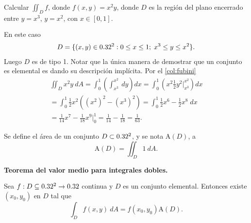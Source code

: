 \begin{example}
    Calcular $\iint_D f$, donde $f(x,y)=x^2y$, donde $D$ es la regi\'on del plano encerrado entre $y=x^3$, $y=x^2$, con $x\in[0,1]$. 

    \begin{center}
    \end{center}

    En este caso 
    \[
        D=\{(x,y)\in0.32^2:0\leq x\leq1;\;x^3\leq y\leq x^2\}.  
    \]
    Luego $D$ es de tipo 1. Notar que la \'unica manera de demostrar que un conjunto es elemental es dando su descripci\'on impl\'icita. Por el \autoref{col:fubini}
    \begin{gather*}
        \iint_D x^2y\:dA=\int_0^1\left(\int_{x^3}^{x^2}\:dy\right)dx=\int_0^1\left(x^2\frac{1}{2}y^2\Big\lvert_{x^3}^{x^2}\right)dx\\
        =\int_0^1\frac{1}{2}x^2\left((x^2)^2-(x^3)^2\right)=\int_0^1\frac{1}{2}x^6-\frac{1}{2}x^8\;dx\\=\frac{1}{14}x^7-\frac{1}{18}x^9\Big\lvert_0^1=\frac{1}{14}-\frac{1}{18}=\frac{1}{63}.
    \end{gather*}
\end{example}
\begin{definition} %
    Se define el \'area de un conjunto $D\subset0.32^2$, y se nota $\text{A}(D)$, a  
    \[
        \text{A}(D)=\iint_D1\:dA.
    \]
\end{definition}
\begin{theorem}
    \textbf{Teorema del valor medio para integrales dobles.} 
    
    Sea $f:D\subseteq0.32^2\to0.32$ continua y $D$ es un conjunto elemental. Entonces existe $(x_0,y_0)$ en $D$ tal que
    \[
        \int_D f(x,y)\:dA=f(x_0,y_0)\text{A}(D).
    \]
\end{theorem}

